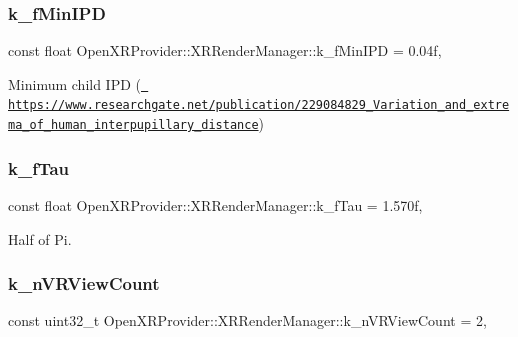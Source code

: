 \subsubsection{\texorpdfstring{k\_fMinIPD}{k\_fMinIPD}}
{\footnotesize\ttfamily const float Open\+X\+R\+Provider\+::\+X\+R\+Render\+Manager\+::k\+\_\+f\+Min\+I\+PD = 0.\+04f\hspace{0.3cm}{\ttfamily [static]}, {\ttfamily [private]}}



Minimum child I\+PD (\href{https://www.researchgate.net/publication/229084829_Variation_and_extrema_of_human_interpupillary_distance}{\texttt{ https\+://www.\+researchgate.\+net/publication/229084829\+\_\+\+Variation\+\_\+and\+\_\+extrema\+\_\+of\+\_\+human\+\_\+interpupillary\+\_\+distance}}) 

\mbox{\label{class_open_x_r_provider_1_1_x_r_render_manager_a9e8ffc6b08bd67c784bc45b572d1fb16}} 
\subsubsection{\texorpdfstring{k\_fTau}{k\_fTau}}
{\footnotesize\ttfamily const float Open\+X\+R\+Provider\+::\+X\+R\+Render\+Manager\+::k\+\_\+f\+Tau = 1.\+570f\hspace{0.3cm}{\ttfamily [static]}, {\ttfamily [private]}}



Half of Pi. 

\mbox{\label{class_open_x_r_provider_1_1_x_r_render_manager_ac45e255445709b7418be38ee9adee932}} 
\subsubsection{\texorpdfstring{k\_nVRViewCount}{k\_nVRViewCount}}
{\footnotesize\ttfamily const uint32\+\_\+t Open\+X\+R\+Provider\+::\+X\+R\+Render\+Manager\+::k\+\_\+n\+V\+R\+View\+Count = 2\hspace{0.3cm}{\ttfamily [static]}, {\ttfamily [private]}}

